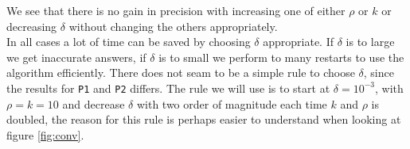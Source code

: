 We see that there is no gain in precision with increasing one of either $\rho$ or $k$ or decreasing $\delta$ without changing the others appropriately. \\

In all cases a lot of time can be saved by choosing $\delta$ appropriate. If $\delta$ is to large we get inaccurate answers, if $\delta$ is to small we perform to many restarts to use the algorithm efficiently. There does not seam to be a simple rule to choose $\delta$, since the results for \texttt{P1} and \texttt{P2} differs. The rule we will use is to start at $\delta=10^{-3}$, with $\rho = k = 10$ and decrease $\delta$ with two order of magnitude each time $k$ and $\rho$ is doubled, the reason for this rule is perhaps easier to understand when looking at figure \ref{fig:conv}.